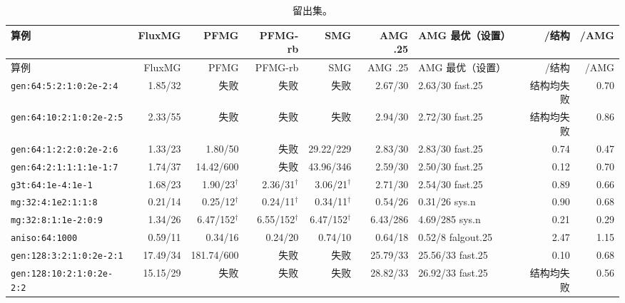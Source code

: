 {\scriptsize\setlength{\tabcolsep}{3pt}
\begin{longtable}{lrrrrrlrr}
\caption{留出集。}\\
\toprule
算例 & FluxMG & PFMG & PFMG-rb & SMG & AMG .25 & AMG 最优（设置） & /结构 & /AMG \\
\midrule
\endfirsthead
\toprule
算例 & FluxMG & PFMG & PFMG-rb & SMG & AMG .25 & AMG 最优（设置） & /结构 & /AMG \\
\midrule
\endhead
\bottomrule
\endlastfoot
\texttt{gen:64:5:2:1:0:2e-2:4} & 1.85/32 & 失败 & 失败 & 失败 & 2.67/30 & 2.63/30 fast.25 & 结构均失败 & 0.70 \\
\texttt{gen:64:10:2:1:0:2e-2:5} & 2.33/55 & 失败 & 失败 & 失败 & 2.94/30 & 2.72/30 fast.25 & 结构均失败 & 0.86 \\
\texttt{gen:64:1:2:2:0:2e-2:6} & 1.33/23 & 1.80/50 & 失败 & 29.22/229 & 2.83/30 & 2.83/30 fast.25 & 0.74 & 0.47 \\
\texttt{gen:64:2:1:1:1:1e-1:7} & 1.74/37 & 14.42/600 & 失败 & 43.96/346 & 2.59/30 & 2.50/30 fast.25 & 0.12 & 0.70 \\
\texttt{g3t:64:1e-4:1e-1} & 1.68/23 & 1.90/23$^\dagger$ & 2.36/31$^\dagger$ & 3.06/21$^\dagger$ & 2.71/30 & 2.54/30 fast.25 & 0.89 & 0.66 \\
\texttt{mg:32:4:1e2:1:1:8} & 0.21/14 & 0.25/12$^\dagger$ & 0.24/11$^\dagger$ & 0.34/11$^\dagger$ & 0.54/26 & 0.31/26 sys.n & 0.90 & 0.68 \\
\texttt{mg:32:8:1:1e-2:0:9} & 1.34/26 & 6.47/152$^\dagger$ & 6.55/152$^\dagger$ & 6.47/152$^\dagger$ & 6.43/286 & 4.69/285 sys.n & 0.21 & 0.29 \\
\texttt{aniso:64:1000} & 0.59/11 & 0.34/16 & 0.24/20 & 0.74/10 & 0.64/18 & 0.52/8 falgout.25 & 2.47 & 1.15 \\
\texttt{gen:128:3:2:1:0:2e-2:1} & 17.49/34 & 181.74/600 & 失败 & 失败 & 25.79/33 & 25.56/33 fast.25 & 0.10 & 0.68 \\
\texttt{gen:128:10:2:1:0:2e-2:2} & 15.15/29 & 失败 & 失败 & 失败 & 28.82/33 & 26.92/33 fast.25 & 结构均失败 & 0.56 \\
\end{longtable}}
